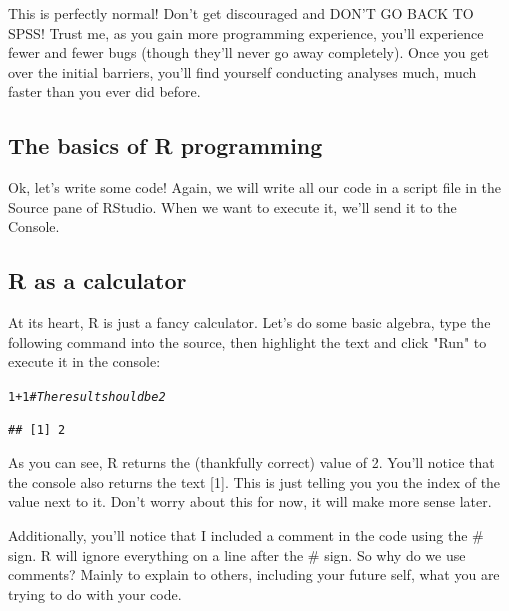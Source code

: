 \documentclass{tufte-book}\usepackage[]{graphicx}\usepackage[]{color}
\makeatletter
\newcommand{\hlnum}[1]{\textcolor[rgb]{0.686,0.059,0.569}{#1}}%
\newcommand{\hlcom}[1]{\textcolor[rgb]{0.678,0.584,0.686}{\textit{#1}}}%
\newcommand{\hlopt}[1]{\textcolor[rgb]{0,0,0}{#1}}%
\newenvironment{kframe}{%
 \def\at@end@of@kframe{}%
 \ifinner\ifhmode%
  \def\at@end@of@kframe{\end{minipage}}%
  \begin{minipage}{\columnwidth}%
 \fi\fi%
 \def\FrameCommand##1{\hskip\@totalleftmargin \hskip-\fboxsep
 \colorbox{shadecolor}{##1}\hskip-\fboxsep
     \hskip-\linewidth \hskip-\@totalleftmargin \hskip\columnwidth}%
 \MakeFramed {\advance\hsize-\width
   \@totalleftmargin\z@ \linewidth\hsize
   \@setminipage}}%
 {\par\unskip\endMakeFramed%
 \at@end@of@kframe}
\newenvironment{knitrout}{}{} %
\makeatother
\begin{document}

This is perfectly normal! Don't get discouraged and DON'T GO BACK TO SPSS! Trust me, as you gain more programming experience, you'll experience fewer and fewer bugs (though they'll never go away completely). Once you get over the initial barriers, you'll find yourself conducting analyses much, much faster than you ever did before.

\subsection{The basics of R programming}

Ok, let's write some code! Again, we will write all our code in a script file in the Source pane of RStudio. When we want to execute it, we'll send it to the Console.

\subsection{R as a calculator}

At its heart, R is just a fancy calculator. Let's do some basic algebra, type the following command into the source, then highlight the text and click "Run" to execute it in the console:



\begin{knitrout}
\color{fgcolor}\begin{kframe}
\begin{alltt}
\hlnum{1}\hlopt{+}\hlnum{1} \hlcom{# The result should be 2}
\end{alltt}
\begin{verbatim}
## [1] 2
\end{verbatim}
\end{kframe}
\end{knitrout}


As you can see, R returns the (thankfully correct) value of 2. You'll notice that the console also returns the text [1]. This is just telling you you the index of the value next to it. Don't worry about this for now, it will make more sense later.

Additionally, you'll notice that I included a comment in the code using the \# sign. R will ignore everything on a line after the \# sign. So why do we use comments? Mainly to explain to others, including your future self, what you are trying to do with your code.
\end{document}
